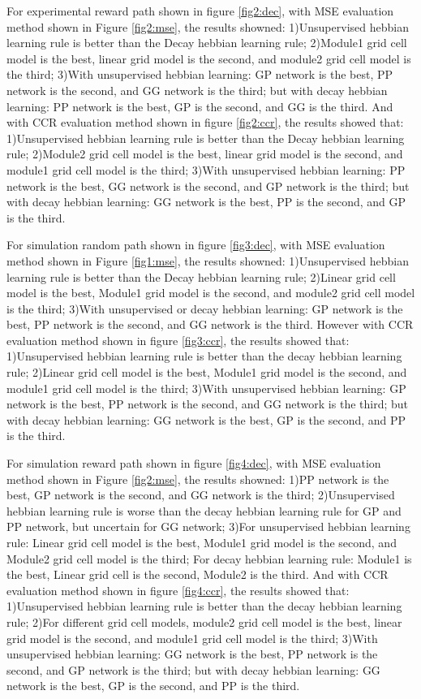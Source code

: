 \documentclass[11pt, letterpaper, onecolumn]{article}
\begin{document}
For experimental reward path shown in figure \ref{fig2:dec}, with MSE evaluation method shown in Figure \ref{fig2:mse}, the results showned: 1)Unsupervised hebbian learning rule is better than the Decay hebbian learning rule; 2)Module1 grid cell model is the best, linear grid model is the second, and module2 grid cell model is the third; 3)With unsupervised hebbian learning: GP network is the best, PP network is the second, and GG network is the third; but with decay hebbian learning: PP network is the best, GP is the second, and GG is the third. And with CCR evaluation method shown in figure \ref{fig2:ccr}, the results showed that: 1)Unsupervised hebbian learning rule is better than the Decay hebbian learning rule; 2)Module2 grid cell model is the best, linear grid model is the second, and module1 grid cell model is the third; 3)With unsupervised hebbian learning: PP network is the best, GG network is the second, and GP network is the third; but with decay hebbian learning: GG network is the best, PP is the second, and GP is the third.

For simulation random path shown in figure \ref{fig3:dec}, with MSE evaluation method shown in Figure \ref{fig1:mse}, the results showned: 1)Unsupervised hebbian learning rule is better than the Decay hebbian learning rule; 2)Linear grid cell model is the best, Module1 grid model is the second, and module2 grid cell model is the third; 3)With unsupervised or decay hebbian learning: GP network is the best, PP network is the second, and GG network is the third. However with CCR evaluation method shown in figure \ref{fig3:ccr}, the results showed that: 1)Unsupervised hebbian learning rule is better than the decay hebbian learning rule; 2)Linear grid cell model is the best, Module1 grid model is the second, and module1 grid cell model is the third; 3)With unsupervised hebbian learning: GP network is the best, PP network is the second, and GG network is the third; but with decay hebbian learning: GG network is the best, GP is the second, and PP is the third.

For simulation reward path shown in figure \ref{fig4:dec}, with MSE evaluation method shown in Figure \ref{fig2:mse}, the results showned: 1)PP network is the best, GP network is the second, and GG network is the third; 2)Unsupervised hebbian learning rule is worse than the decay hebbian learning rule for GP and PP network, but uncertain for GG network; 3)For unsupervised hebbian learning rule: Linear grid cell model is the best, Module1 grid model is the second, and Module2 grid cell model is the third; For decay hebbian learning rule: Module1 is the best, Linear grid cell is the second, Module2 is the third. And with CCR evaluation method shown in figure \ref{fig4:ccr}, the results showed that: 1)Unsupervised hebbian learning rule is better than the decay hebbian learning rule; 2)For different grid cell models, module2 grid cell model is the best, linear grid model is the second, and module1 grid cell model is the third; 3)With unsupervised hebbian learning: GG network is the best, PP network is the second, and GP network is the third; but with decay hebbian learning: GG network is the best, GP is the second, and PP is the third.
\end{document}
